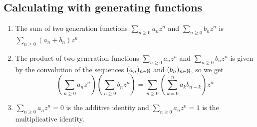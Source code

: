 \documentclass[language=english]{../../Template/TemplateLecture}
\begin{document}
\subsection{Calculating with generating functions}
\begin{beispiel}\leavevmode
    \begin{enumerate}[$(i)$]
        \item The sum of two generation functions $\sum_{n \geq 0} a_n z^n$ and $\sum_{n \geq 0} b_n z^n$ is $\sum_{n \geq 0} (a_n + b_n)z^n$.
        \item The product of two generation functions $\sum_{n \geq 0} a_n z^n$ and $\sum_{n \geq 0} b_n z^n$ is given by the convolution of the sequences $(a_n)_{n \in \mathbb{N}}$ and $(b_n)_{n \in \mathbb{N}}$, so we get 
        \begin{equation}
            \left( \sum_{n \geq 0} a_n z^n \right) \left( \sum_{n \geq 0} b_n z^n \right) = \sum_{n \geq 0} \left( \sum_{k = 0}^n a_k b_{n-k} \right) z^n
        \end{equation}
        \item $\sum_{n \geq 0} a_n z^n = 0$ is the additive identity and $\sum_{n \geq 0} a_n z^n = 1$ is the multiplicative identity.
    \end{enumerate}
\end{beispiel}


\end{document}

